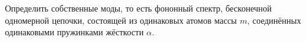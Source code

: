 \documentclass[../final.tex]{subfiles}
\begin{document}





\condition
Определить собственные моды, то есть фононный спектр,
бесконечной одномерной цепочки, состоящей из одинаковых
атомов массы $m$, соединённых одинаковыми пружинками
жёсткости $\alpha$.


\end{document}

